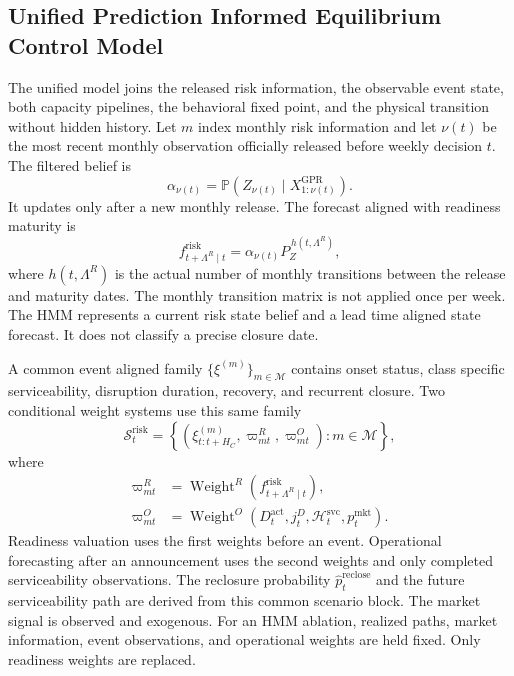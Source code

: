 \documentclass[a4paper,fleqn]{cas-sc}
\newcommand{\Prob}{\mathbb{P}}          %
\begin{document}
\subsection{Unified Prediction Informed Equilibrium Control Model}
\label{subsec:unified-model}

The unified model joins the released risk information, the observable event
state, both capacity pipelines, the behavioral fixed point, and the physical
transition without hidden history. Let $m$ index monthly risk information and
let $\nu(t)$ be the most recent monthly observation officially released before
weekly decision $t$. The filtered belief is
\begin{equation}
 \alpha_{\nu(t)}=
 \Prob\!\left(
 Z_{\nu(t)}
 \mid X^{\mathrm{GPR}}_{1:\nu(t)}
 \right).
 \label{eq:risk-belief}
\end{equation}
It updates only after a new monthly release. The forecast aligned with readiness
maturity is
\begin{equation}
 f^{\mathrm{risk}}_{t+\Lambda^R\mid t}
 =
 \alpha_{\nu(t)}P_Z^{\,h(t,\Lambda^R)},
 \label{eq:lead-time-risk}
\end{equation}
where $h(t,\Lambda^R)$ is the actual number of monthly transitions between the
release and maturity dates. The monthly transition matrix is not applied once
per week. The HMM represents a current risk state belief and a lead time
aligned state forecast. It does not classify a precise closure date.

A common event aligned family
$\{\xi^{(m)}\}_{m\in\mathcal M}$ contains onset status, class specific
serviceability, disruption duration, recovery, and recurrent closure. Two
conditional weight systems use this same family
\begin{equation}
 \mathcal S^{\mathrm{risk}}_t=
 \left\{
 \left(
 \xi^{(m)}_{t:t+H_C},
 \varpi^R_{mt},
 \varpi^O_{mt}
 \right):m\in\mathcal M
 \right\},
 \label{eq:risk-scenario-kernel}
\end{equation}
where
\begin{subequations}\label{eq:scenario-weights}
\begin{align}
 \varpi^R_{mt}
 &=\operatorname{Weight}^R\!\left(
 f^{\mathrm{risk}}_{t+\Lambda^R\mid t}
 \right),\\
 \varpi^O_{mt}
 &=\operatorname{Weight}^O\!\left(
 D_t^{\mathrm{act}},j_t^D,
 \mathcal H_t^{\mathrm{svc}},
 p_t^{\mathrm{mkt}}
 \right).
\end{align}
\end{subequations}
Readiness valuation uses the first weights before an event. Operational
forecasting after an announcement uses the second weights and only completed
serviceability observations. The reclosure probability
$\widehat p_t^{\mathrm{reclose}}$ and the future serviceability path are derived
from this common scenario block. The market signal is observed and exogenous.
For an HMM ablation, realized paths, market information, event observations,
and operational weights are held fixed. Only readiness weights are replaced.
\end{document}

